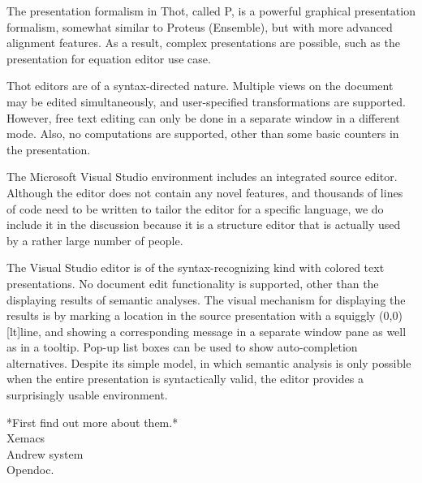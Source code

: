 The presentation formalism in Thot, called P, is a powerful graphical presentation formalism, somewhat similar to Proteus (Ensemble), but with more advanced alignment features. As a result, complex presentations are possible, such as the presentation for equation editor use case.

Thot editors are of a syntax-directed nature. Multiple views on the document may be edited simultaneously, and user-specified transformations are supported. However, free text editing can only be done in a separate window in a different mode. Also, no computations are supported, other than some basic counters in the presentation. 


The Microsoft Visual Studio environment includes an integrated source editor. Although the editor does not contain any novel features, and  thousands of lines of code need to be written to tailor the editor for a specific language, we do include it in the discussion because it is a structure editor that is actually used by a rather large number of people. 

The Visual Studio editor is of the syntax-recognizing kind with colored text presentations. No document edit functionality is supported, other than the displaying results of semantic analyses. The visual mechanism for displaying the results is by marking a location in the source presentation with a squiggly \makebox(0,0)[lt]{}line, and showing a corresponding message in a separate window pane as well as in a tooltip. Pop-up list boxes can be used to show auto-completion alternatives. Despite its simple model, in which semantic analysis is only possible when the entire presentation is syntactically valid, the editor provides a surprisingly usable environment. 

\bc
\toHere     %


*First find out more about them.*\\
Xemacs\\
Andrew system\\
Opendoc.\\

